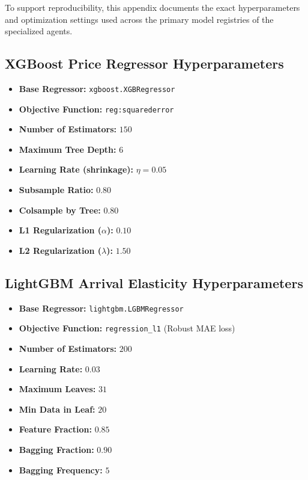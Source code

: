 \documentclass[12pt,a4paper]{report}
\theoremstyle{definition}
\theoremstyle{remark}
\begin{document}
To support reproducibility, this appendix documents the exact hyperparameters and optimization settings used across the primary model registries of the specialized agents.

\subsection{XGBoost Price Regressor Hyperparameters}
\begin{itemize}
    \item \textbf{Base Regressor:} \texttt{xgboost.XGBRegressor}
    \item \textbf{Objective Function:} \texttt{reg:squarederror}
    \item \textbf{Number of Estimators:} $150$
    \item \textbf{Maximum Tree Depth:} $6$
    \item \textbf{Learning Rate (shrinkage):} $\eta = 0.05$
    \item \textbf{Subsample Ratio:} $0.80$
    \item \textbf{Colsample by Tree:} $0.80$
    \item \textbf{L1 Regularization ($\alpha$):} $0.10$
    \item \textbf{L2 Regularization ($\lambda$):} $1.50$
\end{itemize}

\subsection{LightGBM Arrival Elasticity Hyperparameters}
\begin{itemize}
    \item \textbf{Base Regressor:} \texttt{lightgbm.LGBMRegressor}
    \item \textbf{Objective Function:} \texttt{regression\_l1} (Robust MAE loss)
    \item \textbf{Number of Estimators:} $200$
    \item \textbf{Learning Rate:} $0.03$
    \item \textbf{Maximum Leaves:} $31$
    \item \textbf{Min Data in Leaf:} $20$
    \item \textbf{Feature Fraction:} $0.85$
    \item \textbf{Bagging Fraction:} $0.90$
    \item \textbf{Bagging Frequency:} $5$
\end{itemize}
\end{document}
